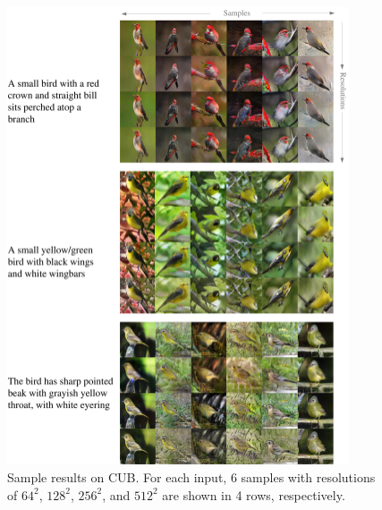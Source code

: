 \documentclass[10pt, letterpaper]{article}
\begin{document}
\newpage
\begin{figure}[th!]
	\centering
	\includegraphics[width=0.9\textwidth]{figure/supp_bird.pdf}

	\caption{Sample results on CUB. For each input, 6 samples with resolutions of $64^2$, $128^2$, $256^2$, and $512^2$ are shown in 4 rows, respectively. }  
	\label{fig:bird}
\end{figure}

\newpage

\end{document}
